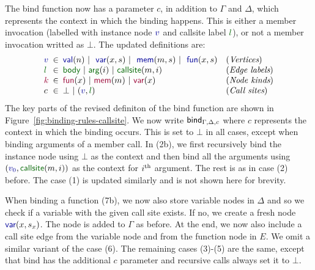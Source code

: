 \documentclass[sigplan,10pt,review,anonymous]{acmart}\settopmatter{printfolios=true,printccs=false,printacmref=false}
\theoremstyle{plain}
\theoremstyle{definition}
\newcommand{\ident}[1]{\textnormal{\sffamily #1}}
\newcommand{\bndclr}[1]{\textcolor{kvdclr}{#1}}
\newcommand{\bkndclr}[1]{\textcolor{prepclr}{#1}}
\newcommand{\blblclr}[1]{\textcolor{numclr}{#1}}
\newcommand{\bnd}[1]{\textnormal{\textcolor{kvdclr}{\sffamily #1}}}
\newcommand{\bknd}[1]{\textnormal{\textcolor{prepclr}{\sffamily #1}}}
\newcommand{\blbl}[1]{\textnormal{\textcolor{numclr}{\sffamily #1}}}
\begin{document}
The \ident{bind} function now has a parameter $c$, in addition to $\Gamma$ and $\Delta$, which 
represents the context in which the binding happens. This is either a member invocation (labelled 
with instance node $\bndclr{v}$ and \blbl{callsite} label $\blblclr{l}$), or not a member 
invocation writted as $\bot$. The updated definitions are:
%
\begin{equation*}
\begin{array}{lcll}
\bndclr{v} &\hspace{-0.5em}\in\hspace{-0.5em}&\bnd{val}(n)~|~\bnd{var}(x, s)~|~\bnd{mem}(m, s)~|~\bnd{fun}(x, s)&(\textit{Vertices})\\
\blblclr{l}&\hspace{-0.5em}\in\hspace{-0.5em}&\blbl{body}~|~\blbl{arg}(i)~|~\blbl{callsite}(m,i)&(\textit{Edge labels})\\
\bkndclr{k}&\hspace{-0.5em}\in\hspace{-0.5em}&\bknd{fun}(x)~|~\bknd{mem}(m)~|~\bknd{var}(x)&(\textit{Node kinds})\\
          c&\hspace{-0.5em}\in\hspace{-0.5em}&\bot ~|~(\bndclr{v}, \blblclr{l})&(\textit{Call sites})\\
\end{array}
\end{equation*}
%
The key parts of the revised definiton of the \ident{bind} function are shown in Figure~\ref{fig:binding-rules-callsite}.
We now write $\ident{bind}_{\Gamma,\Delta,c}$ where $c$ represents the context in which the
binding occurs. This is set to $\bot$ in all cases, except when binding arguments of a member call.
In (2b), we first recursively bind the instance node using $\bot$ as the context and then 
bind all the arguments using $(\bndclr{v_0}, \blbl{callsite}(m, i))$ as the context for $i^{\textnormal{th}}$ 
argument. The rest is as in case (2) before. The case (1) is updated similarly and is not shown 
here for brevity.

When binding a function (7b), we now also store variable nodes in $\Delta$ and so we check if a 
variable with the given call site exists. If no, we create a fresh node $\bnd{var}(x, s_x)$.
The node is added to $\Gamma$ as before. At the end, we now also include a call site edge from the 
variable node and from the function node in $E$. We omit a similar variant of the case (6).
The remaining cases (3)-(5) are the same, except that \ident{bind} has the additional $c$ parameter
and recursive calls always set it to $\bot$.
\end{document}

